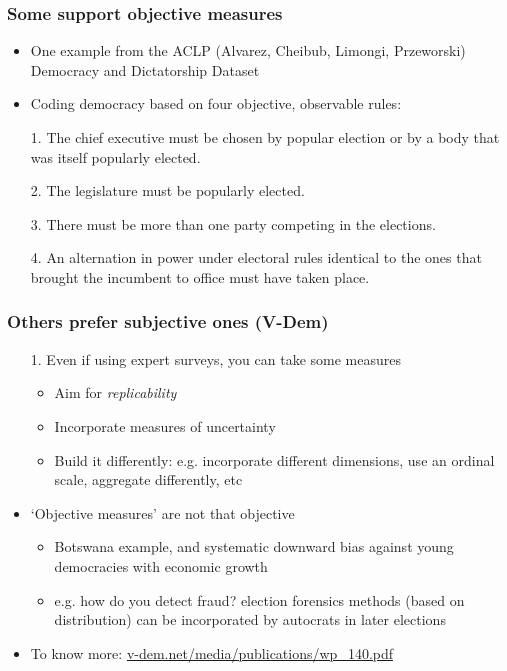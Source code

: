 \documentclass[aspectratio=43]{beamer}
\begin{document}
\begin{frame}
\frametitle{Some support objective measures}
\centering

\begin{itemize}
  \item One example from the ACLP (Alvarez, Cheibub, Limongi, Przeworski) Democracy and Dictatorship Dataset
  \item Coding democracy based on four objective, observable rules:
  \item[1.] {\small The chief executive must be chosen by popular election or by a body that was itself popularly elected.}
  \item[2.] {\small The legislature must be popularly elected.}
  \item[3.] {\small There must be more than one party competing in the elections.}
  \item[4.] {\small An alternation in power under electoral rules identical to the ones that brought the incumbent to office must have taken place.}
\end{itemize}

\end{frame}


\begin{frame}
\frametitle{Others prefer subjective ones (V-Dem)}
\centering

\begin{itemize}
  \item[1.] Even if using expert surveys, you can take some measures
  \begin{itemize}
    \item Aim for \textit{replicability}
    \item Incorporate measures of uncertainty
    \item Build it differently: e.g. incorporate different dimensions, use an ordinal scale, aggregate differently, etc
  \end{itemize}
  \item<2->[2.] `Objective measures' are not that objective
  \begin{itemize}
    \item Botswana example, and systematic downward bias against young democracies with economic growth
    \item e.g. how do you detect fraud? election forensics methods (based on distribution) can be incorporated by autocrats in later elections
  \end{itemize}
  \item[]
  \item {\small To know more: \url{v-dem.net/media/publications/wp_140.pdf}}
\end{itemize}

\end{frame}
\end{document}
